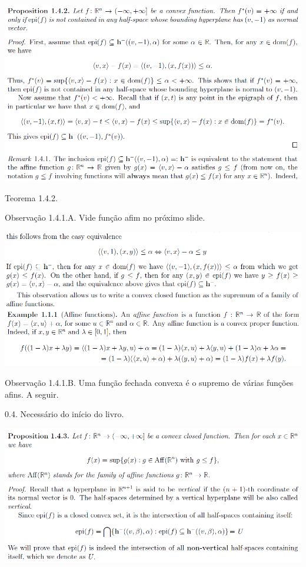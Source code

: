 \documentclass[12pt]{article}
\begin{document}
		\begin{center}
		\includegraphics{4}
		\end{center}

Teorema 1.4.2.

Observa\c{c}\~ao 1.4.1.A. Vide fun\c{c}\~ao afim no pr\'oximo slide.

\vspace{300mm}

		\begin{center}
		\includegraphics[scale=1.2]{5}
		\end{center}

Observa\c{c}\~ao 1.4.1.B. Uma fun\c{c}\~ao fechada convexa \'e o supremo de v\'arias fun\c{c}\~oes afins. A seguir.

0.4. Necess\'ario do in\'icio do livro.

\vspace{300mm}

		\begin{center}
		\includegraphics[scale=1.2]{6}
		\end{center}
\end{document}
